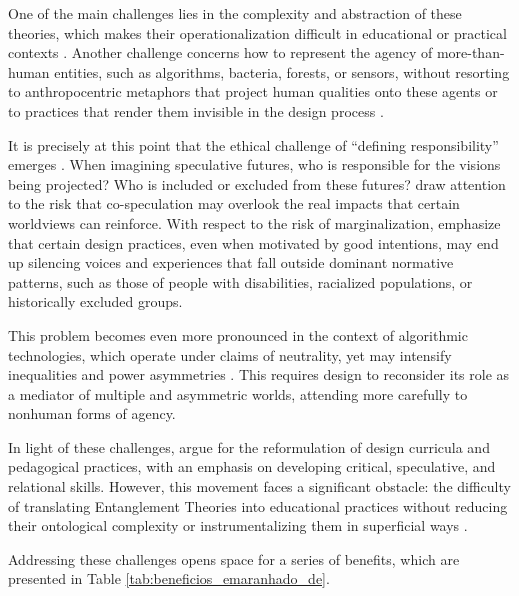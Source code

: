 One of the main challenges lies in the complexity and abstraction of these theories, which makes their operationalization difficult in educational or practical contexts \cite{bekker2023challenges}. Another challenge concerns how to represent the agency of more-than-human entities, such as algorithms, bacteria, forests, or sensors, without resorting to anthropocentric metaphors that project human qualities onto these agents or to practices that render them invisible in the design process \cite{bekker2023challenges}.

It is precisely at this point that the ethical challenge of ``defining responsibility'' emerges \cite{staahl2022making, bekker2023challenges, homewood2021tracing}. When imagining speculative futures, who is responsible for the visions being projected? Who is included or excluded from these futures?  draw attention to the risk that co-speculation may overlook the real impacts that certain worldviews can reinforce. With respect to the risk of marginalization,  emphasize that certain design practices, even when motivated by good intentions, may end up silencing voices and experiences that fall outside dominant normative patterns, such as those of people with disabilities, racialized populations, or historically excluded groups.

This problem becomes even more pronounced in the context of algorithmic technologies, which operate under claims of neutrality, yet may intensify inequalities and power asymmetries \cite{benjamin2023entoptic}. This requires design to reconsider its role as a mediator of multiple and asymmetric worlds, attending more carefully to nonhuman forms of agency.

In light of these challenges,  argue for the reformulation of design curricula and pedagogical practices, with an emphasis on developing critical, speculative, and relational skills. However, this movement faces a significant obstacle: the difficulty of translating Entanglement Theories into educational practices without reducing their ontological complexity or instrumentalizing them in superficial ways \cite{bekker2023challenges}.

Addressing these challenges opens space for a series of benefits, which are presented in Table \ref{tab:beneficios_emaranhado_de}. 

